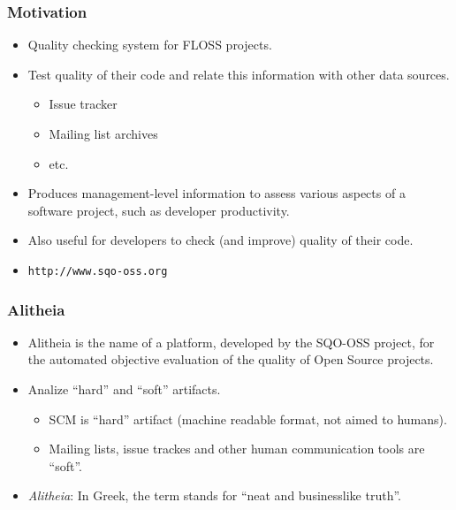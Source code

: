 \documentclass{beamer}
\begin{document}
\begin{frame}
\frametitle{Motivation}
\begin{center}
\begin{itemize}
\item Quality checking system for FLOSS projects.
\item Test quality of their code and relate this information with other data sources.
  \begin{itemize}
   \item Issue tracker
   \item Mailing list archives
   \item etc.
  \end{itemize}

\item Produces management-level information to assess various aspects of a software project, 
such as developer productivity.
\item Also useful for developers to check (and improve) quality of their code.
\item \texttt{http://www.sqo-oss.org}

\end{itemize}
\end{center}
\end{frame}



\begin{frame}
\frametitle{Alitheia}
\begin{center}
\begin{itemize}
\item Alitheia is the name of a platform, developed by the SQO-OSS project, for the automated 
objective evaluation of the quality of Open Source projects.
\item Analize ``hard'' and ``soft'' artifacts.
\begin{itemize}
 \item SCM is ``hard'' artifact (machine readable format, not aimed to humans).
 \item Mailing lists, issue trackes and other human communication tools are ``soft''.
\end{itemize}
\item \textit{Alitheia}: In Greek, the term stands for ``neat and businesslike truth''.

\end{itemize}
\end{center}
\end{frame}
\end{document}
